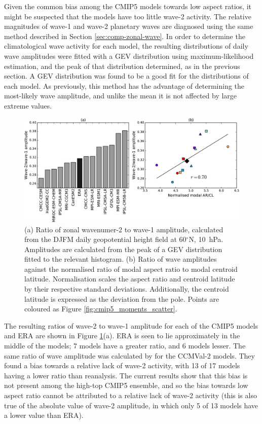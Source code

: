 Given the common bias among the CMIP5 models towards low aspect ratios, it might
be suspected that the models have too little wave-2 activity. The relative
magnitudes of wave-1 and wave-2 planetary waves are diagnosed using the same
method described in Section \ref{sec:comp-zonal-wave}. In order to determine the
climatological wave activity for each model, the resulting distributions of
daily wave amplitudes were fitted with a GEV distribution using
maximum-likelihood estimation, and the peak of that distribution determined, as
in the previous section. A GEV distribution was found to be a good fit for the
distributions of each model. As previously, this method has the advantage of
determining the most-likely wave amplitude, and unlike the mean it is not
affected by large extreme values.

\begin{figure}
 \centering
 \noindent\includegraphics[width=\textwidth]{figures/chapter-models/CMIP5_waves_nolegend.pdf}
 \caption[CMIP5 wave diagnostics]{(a) Ratio of zonal wavenumer-2 to wave-1
   amplitude, calculated from the DJFM daily geopotential height field at
   60$^{\circ}$N, 10~hPa. Amplitudes are calculated from the peak of a GEV
   distribution fitted to the relevant histogram. (b) Ratio of wave amplitudes
   against the normalised ratio of modal aspect ratio to modal centroid
   latitude. Normalisation scales the aspect ratio and centroid latitude by
   their respective standard deviations. Additionally, the centroid latitude is
   expressed as the deviation from the pole. Points are coloured as Figure
   \ref{fig:cmip5_moments_scatter}.}
 \label{fig:cmip5_waves}
\end{figure}

The resulting ratios of wave-2 to wave-1 amplitude for each of the CMIP5 models
and ERA are shown in Figure \ref{fig:cmip5_waves}(a). ERA is seen to lie
approximately in the middle of the models; 7 models have a greater ratio, and 6
models lesser. The same ratio of wave amplitude was calculated by
\citet{Butchart2011} for the CCMVal-2 models. They found a bias towards a
relative lack of wave-2 activity, with 13 of 17 models having a lower ratio than
reanalysis. The current results show that this bias is not present among the
high-top CMIP5 ensemble, and so the bias towards low aspect ratio cannot be
attributed to a relative lack of wave-2 activity (this is also true of the
absolute value of wave-2 amplitude, in which only 5 of 13 models have a lower
value than ERA).

